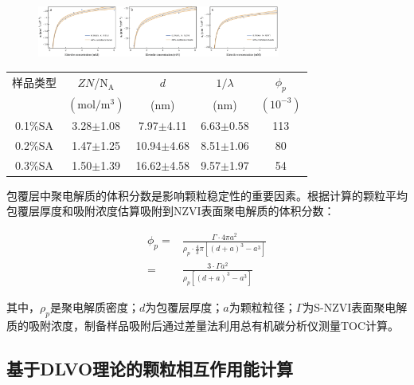 \begin{figure}[h]
    \centering
    \includegraphics[width=8cm]{figs/fig5.pdf}
    \label{fig5}
\end{figure}

\begin{table}
    \centering
    \label{tb1}
    \begin{tabular}{@{}ccccc@{}}
        \toprule
         样品类型 & $ZN$/$\mathrm{N_A}$& $d$ & $1/\lambda$ &$\phi_p$\\
           &$(\mathrm{mol/m^3})$&(nm)&(nm)& $(10^{-3})$ \\
        \midrule
        0.1\%SA & 3.28$\pm$1.08 & 7.97$\pm$4.11 & 6.63$\pm$0.58 & 113\\
        0.2\%SA & 1.47$\pm$1.25 & 10.94$\pm$4.68 & 8.51$\pm$1.06 & 80\\
        0.3\%SA & 1.50$\pm$1.39 & 16.62$\pm$4.58 & 9.57$\pm$1.97 & 54\\
        \bottomrule
    \end{tabular}
\end{table}


包覆层中聚电解质的体积分数是影响颗粒稳定性的重要因素。根据计算的颗粒平均包覆层厚度和吸附浓度估算吸附到NZVI表面聚电解质的体积分数：

\begin{align}
    \phi_p=& \frac{\Gamma\cdot 4\pi a^2}{\rho_p\cdot \frac{4}{3}\pi [(d+a)^3-a^3]}  \\
    =&\frac{3\cdot\Gamma a^2}{\rho_p[(d+a)^3-a^3]} \nonumber
\end{align}

其中，$\rho_p$是聚电解质密度；$d$为包覆层厚度；$a$为颗粒粒径；$\Gamma$为S-NZVI表面聚电解质的吸附浓度，制备样品吸附后通过差量法利用总有机碳分析仪测量TOC计算。


\subsection{基于DLVO理论的颗粒相互作用能计算}

